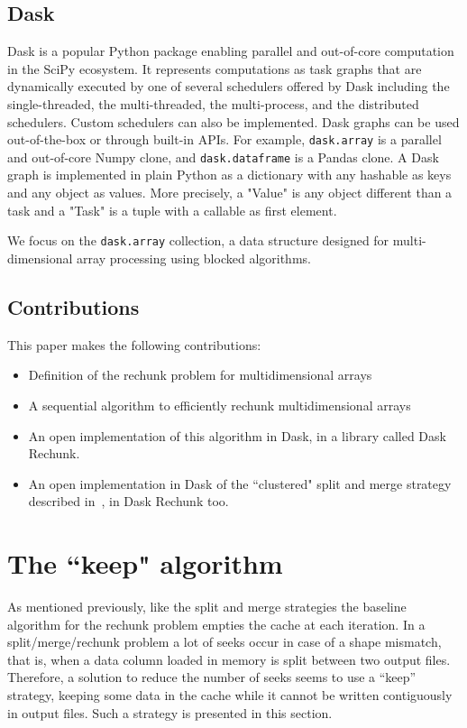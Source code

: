 \documentclass[conference]{IEEEtran}
\begin{document}
\subsection{Dask}

Dask is a popular Python package enabling parallel and out-of-core
computation in the SciPy ecosystem. It represents computations as task
graphs that are dynamically executed by one of several schedulers offered
by Dask including the single-threaded, the multi-threaded, the
multi-process, and the distributed schedulers. Custom schedulers can also
be implemented. Dask graphs can be used out-of-the-box or through built-in
APIs. For example, \texttt{dask.array} is a parallel and out-of-core Numpy
clone, and
\texttt{dask.dataframe} is a Pandas clone. A Dask graph is implemented in
plain Python as a dictionary with any hashable as keys and any object as
values. More precisely, a "Value" is any object different than a task and a
"Task" is a tuple with a callable as first element.

We focus on the \texttt{dask.array} collection, a data structure designed for
multi-dimensional array processing using blocked algorithms.

\subsection{Contributions}
This paper makes the following contributions:
\begin{itemize}
  \item Definition of the rechunk problem for multidimensional arrays
  \item A sequential algorithm to efficiently rechunk multidimensional arrays
  \item An open implementation of this algorithm in Dask, in a library called Dask Rechunk.
  \item An open implementation in Dask of the ``clustered" split and merge strategy described in~\cite{seqalgorithms}, in Dask Rechunk too.
\end{itemize}

\section{The ``keep" algorithm}

As mentioned previously, like the split and merge strategies the baseline
algorithm for the rechunk problem empties the cache at each iteration. In a
split/merge/rechunk problem a lot of seeks occur in case of a shape mismatch,
that is, when a data column loaded in memory is split between two output files.
Therefore, a solution to reduce the number of seeks seems to use a ``keep''
strategy, keeping some data in the cache while it cannot be written contiguously
in output files. Such a strategy is presented in this section.
\end{document}

